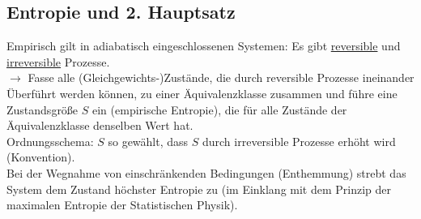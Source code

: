 \subsection{Entropie und 2. Hauptsatz}
Empirisch gilt in adiabatisch eingeschlossenen Systemen: Es gibt \uline{reversible} und \uline{irreversible} Prozesse.\\
$\rightarrow$ Fasse alle (Gleichgewichts-)Zustände, die durch reversible Prozesse ineinander Überführt werden können, zu einer Äquivalenzklasse zusammen und führe eine Zustandsgröße $S$ ein (empirische Entropie), die für alle Zustände der Äquivalenzklasse denselben Wert hat.\\
Ordnungsschema: $S$ so gewählt, dass $S$ durch irreversible Prozesse erhöht wird (Konvention).\\
Bei der Wegnahme von einschränkenden Bedingungen (\glqq Enthemmung\grqq) strebt das System dem Zustand höchster Entropie zu (im Einklang mit dem Prinzip der maximalen Entropie der Statistischen Physik).

